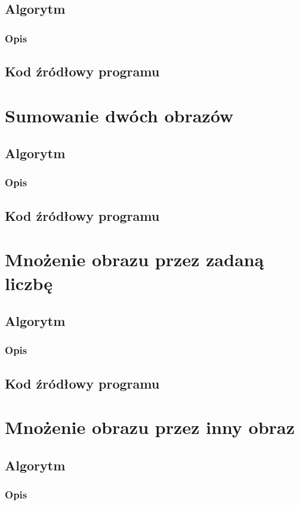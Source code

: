 \documentclass[a4paper,12pt]{book}
\begin{document}
\subsection*{Algorytm}
\subsubsection*{Opis}
\subsection*{Kod źródłowy programu}

\section{Sumowanie dwóch obrazów}
\subsection*{Algorytm}
\subsubsection*{Opis}
\subsection*{Kod źródłowy programu}

\section{Mnożenie obrazu przez zadaną liczbę}
\subsection*{Algorytm}
\subsubsection*{Opis}
\subsection*{Kod źródłowy programu}

\section{Mnożenie obrazu przez inny obraz}
\subsection*{Algorytm}
\subsubsection*{Opis}
\end{document}
